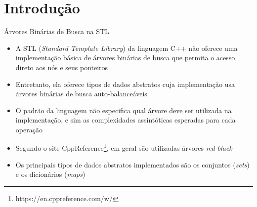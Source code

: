 \section{Introdução}

\begin{frame}[fragile]{Árvores Binárias de Busca na STL}

    \begin{itemize}
        \item A STL (\textit{Standard Template Library}) da linguagem C++ não oferece uma
            implementação básica de árvores binárias de busca que permita o acesso direto
            aos nós e seus ponteiros

        \item Entretanto, ela oferece tipos de dados abstratos cuja implementação usa árvores
            binárias de busca auto-balanceáveis

        \item O padrão da linguagem não especifica qual árvore deve ser utilizada na implementação,
            e sim as complexidades assintóticas esperadas para cada operação

        \item Segundo o site CppReference\footnote{https://en.cppreference.com/w/}, em geral 
            são utilizadas árvores \textit{red-black} 

        \item Os principais tipos de dados abstratos implementados são os conjuntos 
            (\textit{sets}) e os dicionários (\textit{maps})
    \end{itemize}

\end{frame}
